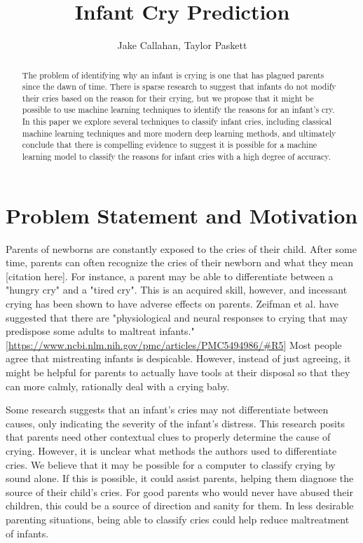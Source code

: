 \documentclass[11pt]{article}
\title{Infant Cry Prediction}
\author{Jake Callahan, Taylor Paskett}
\begin{document}
\maketitle

\begin{abstract}
   The problem of identifying why an infant is crying is one that has plagued parents since the dawn of time.
   There is sparse research to suggest that infants do not modify their cries based on the reason for their crying, but we propose that it might be possible to use machine learning techniques to identify the reasons for an infant's cry. 
   In this paper we explore several techniques to classify infant cries, including classical machine learning techniques and more modern deep learning methods, and ultimately conclude that there is compelling evidence to suggest it is possible for a machine learning model to classify the reasons for infant cries with a high degree of accuracy.
\end{abstract}

\section{Problem Statement and Motivation}
Parents of newborns are constantly exposed to the cries of their child.
After some time, parents can often recognize the cries of their newborn and what they mean [citation here].
For instance, a parent may be able to differentiate between a "hungry cry" and a "tired cry".
This is an acquired skill, however, and incessant crying has been shown to have adverse effects on parents.
Zeifman et al. have suggested that there are "physiological and neural responses to crying that may predispose some adults to maltreat infants." [\url{https://www.ncbi.nlm.nih.gov/pmc/articles/PMC5494986/#R5}]
Most people agree that mistreating infants is despicable.
However, instead of just agreeing, it might be helpful for parents to actually have tools at their disposal so that they can more calmly, rationally deal with a crying baby.

Some research suggests that an infant's cries may not differentiate between causes, only indicating the severity of the infant's distress.
This research posits that parents need other contextual clues to properly determine the cause of crying.
However, it is unclear what methods the authors used to differentiate cries.
We believe that it may be possible for a computer to classify crying by sound alone.
If this is possible, it could assist parents, helping them diagnose the source of their child's cries.
For good parents who would never have abused their children, this could be a source of direction and sanity for them.
In less desirable parenting situations, being able to classify cries could help reduce maltreatment of infants.
\end{document}

